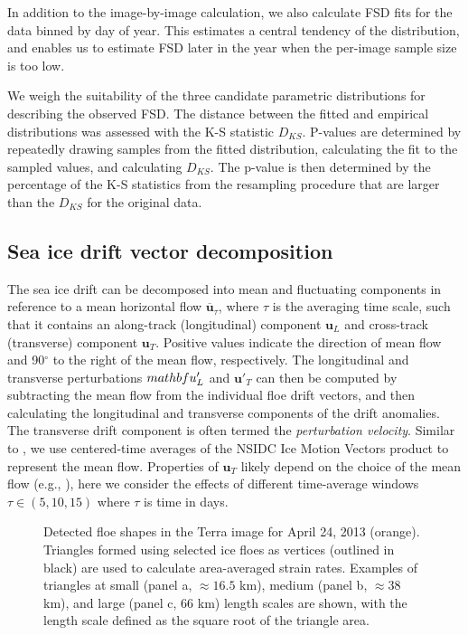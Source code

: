\documentclass[aog]{igs}
\begin{document}
In addition to the image-by-image calculation, we also calculate FSD fits for the data binned by day of year. This estimates a central tendency of the distribution, and enables us to estimate FSD later in the year when the per-image sample size is too low.

We weigh the suitability of the three candidate parametric distributions for describing the observed FSD.
The distance between the fitted and empirical distributions was assessed with the K-S statistic $D_{KS}$. 
P-values are determined by repeatedly drawing samples from the fitted distribution, calculating the fit to the sampled values, and calculating $D_{KS}$.
The p-value is then determined by the percentage of the K-S statistics from the resampling procedure that are larger than the $D_{KS}$ for the original data. 

\subsection{Sea ice drift vector decomposition}
The sea ice drift can be decomposed into mean and fluctuating components in reference to a mean horizontal flow $\overline{\mathbf{u}}_\tau$, where $\tau$ is the averaging time scale, such that it contains an along-track (longitudinal) component $\mathbf{u}_L$ and cross-track (transverse) component $\mathbf{u}_T$. Positive values indicate the direction of mean flow and 90$^\circ$ to the right of the mean flow, respectively. The longitudinal and transverse perturbations $\\mathbf{u}'_L$ and $\mathbf{u}'_T$ can then be computed by subtracting the mean flow from the individual floe drift vectors, and then calculating the longitudinal and transverse components of the drift anomalies. The transverse drift component is often termed the \emph{perturbation velocity}. Similar to \cite{gabrielski2015_AnomalousDispersion}, we use centered-time averages of the NSIDC Ice Motion Vectors product to represent the mean flow.
Properties of $\mathbf{u}_T$ likely depend on the choice of the mean flow (e.g., \citet{rampal2009_turbulentFluctuations}), here we consider the effects of different time-average windows $\tau \in (5, 10, 15)$ where $\tau$ is time in days. 

\begin{figure*}
\caption{Detected floe shapes in the Terra image for April 24, 2013 (orange). Triangles formed using selected ice floes as vertices (outlined in black) are used to calculate area-averaged strain rates. Examples of triangles at small (panel a, $\approx 16.5$ km), medium (panel b, $\approx 38$ km), and large (panel c, $66$ km) length scales are shown, with the length scale defined as the square root of the triangle area.}
\label{fig6_polygons}
\end{figure*}
\end{document}
